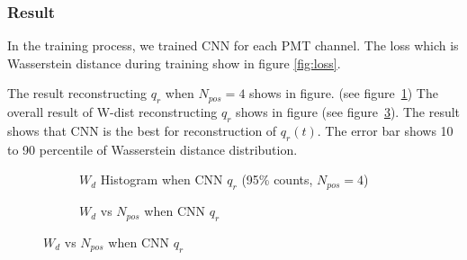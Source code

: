 \subsubsection{Result}
In the training process, we trained CNN for each PMT channel. The loss which is Wasserstein distance during training show in figure \ref{fig:loss}. 

The result reconstructing $q_{r}$ when $N_{pos}=4$ shows in figure. (see figure~\ref{fig:cnn-hist}) The overall result of W-dist reconstructing $q_{r}$ shows in figure (see figure~\ref{fig:cnn-npos}). The result shows that CNN is the best for reconstruction of $q_{r}(t)$. The error bar shows 10 to 90 percentile of Wasserstein distance distribution. 

\begin{figure}[H]
\begin{minipage}[t]{.5\textwidth}
\begin{figure}[H]
    \centering
    \resizebox{\textwidth}{!}{}
    \caption{\label{fig:cnn-hist} $W_{d}$ Histogram when CNN $q_{r}$ (95\% counts, $N_{pos}=4$)}
\end{figure}
\end{minipage}
\begin{minipage}[t]{.5\textwidth}
\begin{figure}[H]
    \centering
    \resizebox{\textwidth}{!}{}
    \caption{\label{fig:cnn-npos}$W_{d}$ vs $N_{pos}$ when CNN $q_{r}$}
\end{figure}
\end{minipage}
\end{figure}

